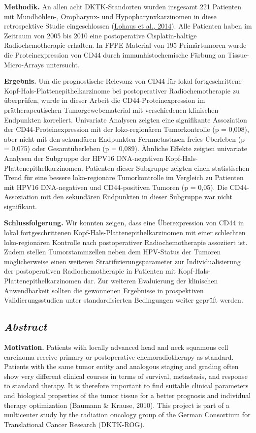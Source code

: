 \textbf{Methodik.} An allen acht DKTK-Standorten wurden insgesamt 221 Patienten mit Mundhöhlen-, Oropharynx- und Hypopharynxkarzinomen in diese retrospektive Studie eingeschlossen (\href{about:blank\#_ENREF_52}{Lohaus et al., 2014}). Alle Patienten haben im Zeitraum von 2005 bis 2010 eine postoperative Cisplatin-haltige Radiochemotherapie erhalten. In FFPE-Material von 195 Primärtumoren wurde die Proteinexpression von CD44 durch immunhistochemische Färbung an Tissue-Micro-Arrays untersucht.

\textbf{Ergebnis.} Um die prognostische Relevanz von CD44 für lokal fortgeschrittene Kopf-Hals-Plattenepithelkarzinome bei postoperativer Radiochemotherapie zu überprüfen, wurde in dieser Arbeit die CD44-Proteinexpression im prätherapeutischen Tumorgewebematerial mit verschiedenen klinischen Endpunkten korreliert. Univariate Analysen zeigten eine signifikante Assoziation der CD44-Proteinexpression mit der loko-regionären Tumorkontrolle (p = 0,008), aber nicht mit den sekundären Endpunkten Fernmetastasen-freies Überleben (p = 0,075) oder Gesamtüberleben (p = 0,089). Ähnliche Effekte zeigten univariate Analysen der Subgruppe der HPV16 DNA-negativen Kopf-Hals-Plattenepithelkarzinomen. Patienten dieser Subgruppe zeigten einen statistischen Trend für eine bessere loko-regionäre Tumorkontrolle im Vergleich zu Patienten mit HPV16 DNA-negativen und CD44-positiven Tumoren (p = 0,05). Die CD44-Assoziation mit den sekundären Endpunkten in dieser Subgruppe war nicht signifikant.

\textbf{Schlussfolgerung.} Wir konnten zeigen, dass eine Überexpression von CD44 in lokal fortgeschrittenen Kopf-Hals-Plattenepithelkarzinomen mit einer schlechten loko-regionären Kontrolle nach postoperativer Radiochemotherapie assoziiert ist. Zudem stellen Tumorstammzellen neben dem HPV-Status der Tumoren möglicherweise einen weiteren Stratifizierungsparameter zur Individualisierung der postoperativen Radiochemotherapie in Patienten mit Kopf-Hals-Plattenepithelkarzinomen dar. Zur weiteren Evaluierung der klinischen Anwendbarkeit sollten die gewonnenen Ergebnisse in prospektiven Validierungsstudien unter standardisierten Bedingungen weiter geprüft werden.

\hypertarget{abstract}{%
\subsection{\texorpdfstring{\textbf{\emph{Abstract}}}{Abstract}}\label{abstract}}

\textbf{Motivation.} Patients with locally advanced head and neck squamous cell carcinoma receive primary or postoperative chemoradiotherapy as standard. Patients with the same tumor entity and analogous staging and grading often show very different clinical courses in terms of survival, metastasis, and response to standard therapy. It is therefore important to find suitable clinical parameters and biological properties of the tumor tissue for a better prognosis and individual therapy optimization (Baumann \& Krause, 2010). This project is part of a multicenter study by the radiation oncology group of the German Consortium for Translational Cancer Research (DKTK-ROG).

